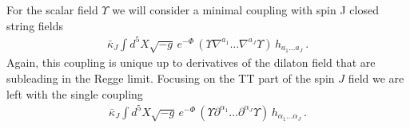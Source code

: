 \documentclass[12pt,a4paper]{article}
\begin{document}
For the scalar field $\Upsilon$ we will consider a minimal coupling with spin J closed string fields
\begin{eqnarray}
\bar{\kappa}_J \int d^5 X \sqrt{-g} \, e^{-\Phi } \, \left ( \Upsilon \nabla^{a_1} \dots \nabla^{a_J} \Upsilon \right ) \,  h_{a_1 \dots a_J} \, .
\label{eq:couplingScalar}
\end{eqnarray}
Again, this coupling is unique up to derivatives of the dilaton field that are subleading in the Regge limit. Focusing on the TT part of the spin $J$
field we are left with the single coupling
\begin{eqnarray}
\bar{\kappa}_J \int d^5 X \sqrt{-g} \, e^{-\Phi } \, \left ( \Upsilon \partial^{\alpha_1} \dots \partial^{\alpha_J} \Upsilon \right ) \,  h_{\alpha_1 \dots \alpha_J} \, .
\label{eq:couplingScalar2}
\end{eqnarray}


\end{document}
